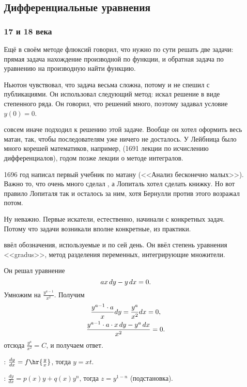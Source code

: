 \documentclass[a4paper,oneside,fleqn,10pt]{article}
\begin{document}
\subsection{Дифференциальные уравнения}

\subsubsection{17 и 18 века}

Ещё  в своём методе флюксий говорил, что нужно по сути решать две задачи:
прямая задача нахождение производной по функции, и обратная задача по уравнению
на производную найти функцию.

Ньютон чувствовал, что задача весьма сложна, потому и не спешил с публикациями.
Он использовал следующий метод: искал решение в виде степенного ряда.
Он говорил, что решений много, поэтому задавал условие $y(0) = 0$.

 совсем иначе подходил к решению этой задаче. Вообще он хотел оформить весь
матан, так, чтобы последователям уже ничего не досталось. У Лейбница было много
корешей математиков, например,  (1691 лекции по исчислению дифференциалов),
годом позже лекции о методе интегралов.

1696 год  написал первый учебник по матану (<<Анализ бесконечно малых>>).
Важно то, что очень много сделал , а Лопиталь хотел сделать книжку.
Но вот правило Лопиталя так и осталось за ним, хотя Бернулли против этого возражал потом.

Ну неважно. Первые искатели, естественно, начинали с конкретных задач.
Потому что задачи  возникали вполне конкретные, из практики.

 ввёл обозначения, используемые и по сей день.
Он ввёл степень уравнения <<gradus>>, метод разделения переменных,
интегрирующие множители.

Он решал уравнение
$$ax\,dy - y\,dx = 0.$$
Умножим на $\frac{y^{a-1}}{x^2}$. Получим
\begin{gather*}
\frac{y^{a-1}\cdot a}{x}dy = \frac{y^a}{x^2} dx = 0,\\
\frac{y^{a-1}\cdot a \cdot x\,dy - y^a\,dx}{x^2} = 0.
\end{gather*}
отсюда $\frac{y^a}{x^2} = C$, и получаем ответ.

:
$\frac{dy}{dx} = f\hr{\frac yx}$, тогда $y = xt$.

: $\frac{dy}{dx} = p(x) y + q(x) y^n$, тогда $z = y^{1-n}$ (подстановка).
\end{document}
